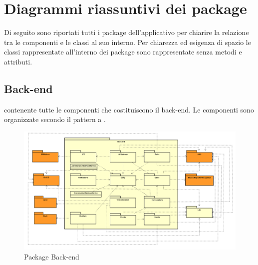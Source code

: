 \section{Diagrammi riassuntivi dei package}
Di seguito sono riportati tutti i package dell’applicativo per chiarire la relazione tra le componenti e le classi al suo interno. Per chiarezza ed esigenza di spazio le classi rappresentate all’interno dei package sono rappresentate senza metodi e attributi.


\subsection{Back-end}
 contenente tutte le componenti che costituiscono il back-end. Le componenti sono organizzate secondo il pattern a .
\begin{figure}[h] \centering \includegraphics[width=\textwidth,height=\textheight,keepaspectratio]{images/diagrams/back-end/Official_Backend_0304/Back-end.png}
\caption{Package Back-end}
\end{figure}
\newpage

